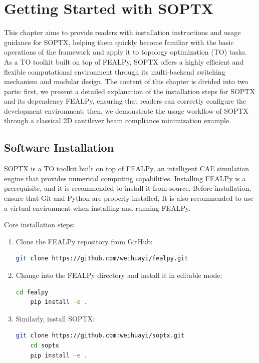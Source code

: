 \documentclass[mathpazo]{cicp}
\begin{document}
\section{Getting Started with SOPTX}
This chapter aims to provide readers with installation instructions and usage guidance for SOPTX, helping them quickly become familiar with the basic operations of the framework and apply it to topology optimization (TO) tasks. As a TO toolkit built on top of FEALPy, SOPTX offers a highly efficient and flexible computational environment through its multi-backend switching mechanism and modular design. The content of this chapter is divided into two parts: first, we present a detailed explanation of the installation steps for SOPTX and its dependency FEALPy, ensuring that readers can correctly configure the development environment; then, we demonstrate the usage workflow of SOPTX through a classical 2D cantilever beam compliance minimization example.

\subsection{Software Installation}
SOPTX is a TO toolkit built on top of FEALPy, an intelligent CAE simulation engine that provides numerical computing capabilities. Installing FEALPy is a prerequisite, and it is recommended to install it from source. Before installation, ensure that Git and Python are properly installed. It is also recommended to use a virtual environment when installing and running FEALPy.
 
Core installation steps:
\begin{enumerate} 
	\item Clone the FEALPy repository from GitHub:
\begin{lstlisting}[language=bash]
	git clone https://github.com/weihuayi/fealpy.git
\end{lstlisting}
	\item Change into the FEALPy directory and install it in editable mode:
\begin{lstlisting}[language=bash]
	cd fealpy
	pip install -e . 
\end{lstlisting}
	\item Similarly, install SOPTX:
\begin{lstlisting}[language=bash]
	git clone https://github.com:weihuayi/soptx.git
	cd soptx
	pip install -e . 
\end{lstlisting}
\end{enumerate}
\end{document}
